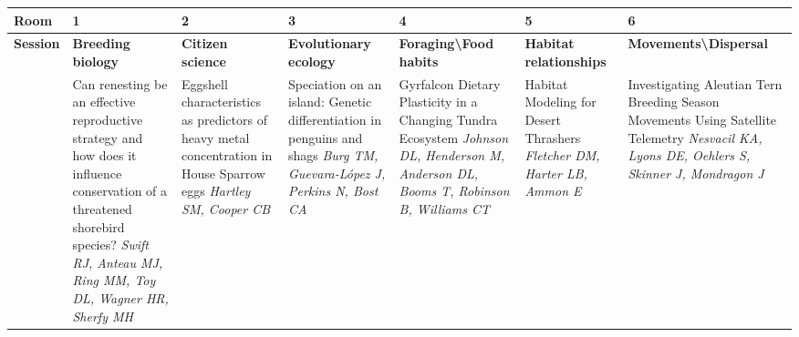 \begin{tabular}{|x{0.75cm}|x{2.25cm}|x{2.25cm}|x{2.25cm}|x{2.25cm}|x{2.25cm}|x{2.25cm}|}\hline
Room & 1 & 2 & 3 & 4 & 5 & 6\\
\hline
\rule{0pt}{1em} \textbf{Session} &\footnotesize \textbf{Breeding biology} & \footnotesize \textbf{Citizen science} & \footnotesize \textbf{Evolutionary ecology} & \footnotesize \textbf{Foraging\textbackslash Food habits} & \footnotesize \textbf{Habitat relationships} & \footnotesize \textbf{Movements\textbackslash Dispersal}\\
\hline
{}&Can renesting be an effective reproductive strategy and how does it influence conservation of a threatened shorebird species? \newline \newline \textit{Swift RJ, Anteau MJ, Ring MM, Toy DL, Wagner HR, Sherfy MH} & Eggshell characteristics as predictors of heavy metal concentration in House Sparrow eggs \newline \newline \textit{Hartley SM, Cooper CB} & Speciation on an island: Genetic differentiation in penguins and shags \newline \newline \textit{Burg TM, Guevara-L\'{o}pez J, Perkins N, Bost CA} & Gyrfalcon Dietary Plasticity in a Changing Tundra Ecosystem \newline \newline \textit{Johnson DL, Henderson M, Anderson DL, Booms T, Robinson B, Williams CT} & Habitat Modeling for Desert Thrashers \newline \newline \textit{Fletcher DM, Harter LB, Ammon E} & Investigating Aleutian Tern Breeding Season Movements Using Satellite Telemetry \newline \newline \textit{Nesvacil KA, Lyons DE, Oehlers S, Skinner J, Mondragon J}\\
\hline

\end{tabular}
